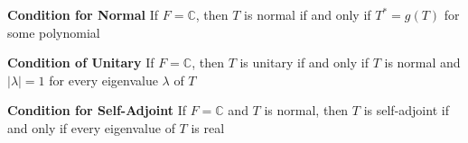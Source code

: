 \documentclass[11pt]{article}
\begin{document}
\begin{corollary*}
    \textbf{Condition for Normal} If $F=\mathbb{C}$, then $T$ is normal if and only if $T^* = g(T)$ for some polynomial 
\end{corollary*}

\begin{corollary*}
    \textbf{Condition of Unitary} If $F = \mathbb{C}$, then $T$ is unitary if and only if $T$ is normal and $|\lambda|=1$ for every eigenvalue $\lambda$ of $T$
\end{corollary*}

\begin{corollary*}
    \textbf{Condition for Self-Adjoint} If $F = \mathbb{C}$ and $T$ is normal, then $T$ is self-adjoint if and only if every eigenvalue of $T$ is real
\end{corollary*}
\end{document}
